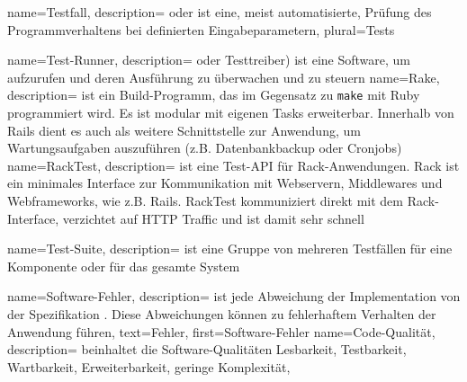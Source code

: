  {
  name={Testfall},
  description= { oder  ist eine, meist automatisierte, Prüfung des Programmverhaltens bei definierten Eingabeparametern},
  plural={Tests}
}

 {
  name={Test-Runner},
  description= {oder Testtreiber) ist eine Software, um  aufzurufen und deren Ausführung zu überwachen und zu steuern}
}
 {
  name={Rake},
  description= {ist ein Build-Programm, das im Gegensatz zu \texttt{make} mit Ruby programmiert wird. Es ist modular mit eigenen Tasks erweiterbar. Innerhalb von Rails dient es auch als weitere Schnittstelle zur Anwendung, um Wartungsaufgaben auszuführen (z.B. Datenbankbackup oder Cronjobs)}
}
 {
  name={RackTest},
  description= { ist eine Test-API für Rack-Anwendungen. Rack ist ein minimales Interface zur Kommunikation mit Webservern, Middlewares und Webframeworks, wie z.B. Rails. RackTest kommuniziert direkt mit dem Rack-Interface, verzichtet auf HTTP Traffic und ist damit sehr schnell}
}

 {
  name={Test-Suite},
  description= {ist eine Gruppe von mehreren Testfällen für eine Komponente oder für das gesamte System}
}

 {
  name={Software-Fehler},
  description= {ist jede Abweichung der Implementation von der Spezifikation \citep[IEEE/ANSI]{fritzsche_sqm_2005}. Diese Abweichungen können zu fehlerhaftem Verhalten der Anwendung führen},
  text=Fehler,
  first={Software-Fehler}
}
 {
  name={Code-Qualität},
  description= {beinhaltet die Software-Qualitäten Lesbarkeit, Testbarkeit, Wartbarkeit, Erweiterbarkeit, geringe Komplexität},
}

